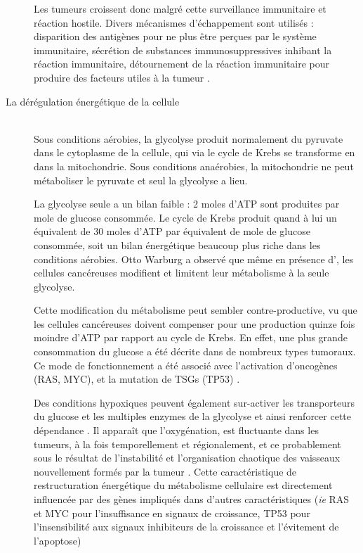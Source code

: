 \begin{description}
					Les tumeurs croissent donc malgré cette surveillance immunitaire et réaction hostile.
					Divers mécanismes d'échappement sont utilisés : disparition des antigènes pour ne plus être perçues par le système immunitaire, sécrétion de substances immunosuppressives inhibant la réaction immunitaire, détournement de la réaction immunitaire pour produire des facteurs utiles à la tumeur \citep{Manjili2012}.

				\item [La dérégulation énergétique de la cellule]               \hfill \\
					Sous conditions aérobies, la glycolyse produit normalement du pyruvate dans le cytoplasme de la cellule, qui via le cycle de Krebs se transforme en {\COO} dans la mitochondrie.
					Sous conditions anaérobies, la mitochondrie ne peut métaboliser le pyruvate et seul la glycolyse a lieu.

					La glycolyse seule a un bilan faible : 2 moles d'\acs{ATP} sont produites par mole de glucose consommée.
					Le cycle de Krebs produit quand à lui un équivalent de 30 moles d'\acs{ATP} par équivalent de mole de glucose consommée, soit un bilan énergétique beaucoup plus riche dans les conditions aérobies.
					Otto Warburg a observé que même en présence d'{\OO}, les cellules cancéreuses modifient et limitent leur métabolisme à la seule glycolyse.

					Cette modification du métabolisme peut sembler contre-productive, vu que les cellules cancéreuses doivent compenser pour une production quinze fois moindre d'\acs{ATP} par rapport au cycle de Krebs.
					En effet, une plus grande consommation du glucose a été décrite dans de nombreux types tumoraux.
					Ce mode de fonctionnement a été associé avec l'activation d'oncogènes (\acs{RAS}, \acs{MYC}), et la mutation de \acsp{TSG} (\acs{TP53}) \citep{Deberardinis2008}.

					Des conditions hypoxiques peuvent également sur-activer les transporteurs du glucose et les multiples enzymes de la glycolyse et ainsi renforcer cette dépendance \citep{Deberardinis2008}.
					Il apparaît que l'oxygénation, est fluctuante dans les tumeurs, à la fois temporellement et régionalement, et ce probablement sous le résultat de l'instabilité et l'organisation chaotique des vaisseaux nouvellement formés par la tumeur \citep{Hardee2009}.
					Cette caractéristique de restructuration énergétique du métabolisme cellulaire est directement influencée par des gènes impliqués dans d'autres caractéristiques (\emph{ie} \acs{RAS} et \acs{MYC} pour l'insuffisance en signaux de croissance, \acs{TP53} pour l'insensibilité aux signaux inhibiteurs de la croissance et l'évitement de l'apoptose)
			\end{description}

